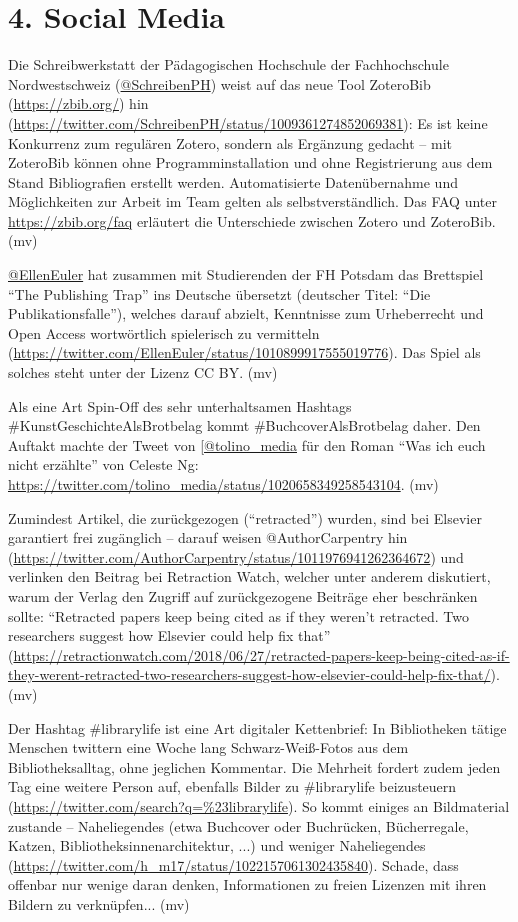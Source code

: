 \documentclass[a4paper,
fontsize=11pt,
oneside,
numbers=noperiodatend,
parskip=half-,
bibliography=totoc,
final
]{scrartcl}
\begin{document}
\hypertarget{social-media}{%
\section{4. Social Media}\label{social-media}}

Die Schreibwerkstatt der Pädagogischen Hochschule der Fachhochschule
Nordwestschweiz (\href{https://twitter.com/SchreibenPH}{@SchreibenPH})
weist auf das neue Tool ZoteroBib (\url{https://zbib.org/}) hin
(\url{https://twitter.com/SchreibenPH/status/1009361274852069381}): Es
ist keine Konkurrenz zum regulären Zotero, sondern als Ergänzung gedacht
-- mit ZoteroBib können ohne Programminstallation und ohne Registrierung
aus dem Stand Bibliografien erstellt werden. Automatisierte
Datenübernahme und Möglichkeiten zur Arbeit im Team gelten als
selbstverständlich. Das FAQ unter \url{https://zbib.org/faq} erläutert
die Unterschiede zwischen Zotero und ZoteroBib. (mv)

\href{https://twitter.com/EllenEuler}{@EllenEuler} hat zusammen mit
Studierenden der FH Potsdam das Brettspiel \enquote{The Publishing Trap}
ins Deutsche übersetzt (deutscher Titel: \enquote{Die
Publikationsfalle}), welches darauf abzielt, Kenntnisse zum Urheberrecht
und Open Access wortwörtlich spielerisch zu vermitteln
(\url{https://twitter.com/EllenEuler/status/1010899917555019776}). Das
Spiel als solches steht unter der Lizenz CC BY. (mv)

Als eine Art Spin-Off des sehr unterhaltsamen Hashtags
\#KunstGeschichteAlsBrotbelag kommt \#BuchcoverAlsBrotbelag daher. Den
Auftakt machte der Tweet von
{[}\href{https://twitter.com/tolino_media}{@tolino\_media} für den Roman
\enquote{Was ich euch nicht erzählte} von Celeste Ng:
\url{https://twitter.com/tolino_media/status/1020658349258543104}. (mv)

Zumindest Artikel, die zurückgezogen (\enquote{retracted}) wurden, sind
bei Elsevier garantiert frei zugänglich -- darauf weisen
@AuthorCarpentry hin
(\url{https://twitter.com/AuthorCarpentry/status/1011976941262364672})
und verlinken den Beitrag bei Retraction Watch, welcher unter anderem
diskutiert, warum der Verlag den Zugriff auf zurückgezogene Beiträge
eher beschränken sollte: \enquote{Retracted papers keep being cited as
if they weren't retracted. Two researchers suggest how Elsevier could
help fix that}
(\url{https://retractionwatch.com/2018/06/27/retracted-papers-keep-being-cited-as-if-they-werent-retracted-two-researchers-suggest-how-elsevier-could-help-fix-that/}).
(mv)

Der Hashtag \#librarylife ist eine Art digitaler Kettenbrief: In
Bibliotheken tätige Menschen twittern eine Woche lang Schwarz-Weiß-Fotos
aus dem Bibliotheksalltag, ohne jeglichen Kommentar. Die Mehrheit
fordert zudem jeden Tag eine weitere Person auf, ebenfalls Bilder zu
\#librarylife beizusteuern
(\url{https://twitter.com/search?q=\%23librarylife}). So kommt einiges
an Bildmaterial zustande -- Naheliegendes (etwa Buchcover oder
Buchrücken, Bücherregale, Katzen, Bibliotheksinnenarchitektur, ...) und
weniger Naheliegendes
(\url{https://twitter.com/h_m17/status/1022157061302435840}). Schade,
dass offenbar nur wenige daran denken, Informationen zu freien Lizenzen
mit ihren Bildern zu verknüpfen... (mv)
\end{document}
